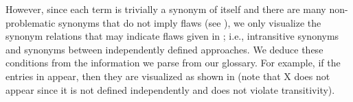     \clearpage\else
    \flawMnfstsTable{}
    \flawDmnsTable{}
\fi
However, since each term is trivially a synonym of itself and there are many
non-problematic synonyms that do not imply flaws (see ),
we only visualize the synonym relations that may indicate flaws given in
; i.e., intransitive synonyms and synonyms between
independently defined approaches.
\ifnotpaper
    We deduce these conditions from the information we parse from our glossary.
    For example, if the entries in  appear, then
    they are visualized as shown in  (note that X
    does not appear since it is not defined independently and does not violate
    transitivity).

